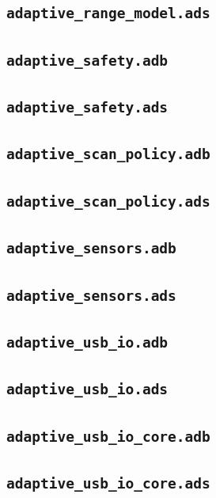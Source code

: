 \subsection*{\texttt{adaptive\_range\_model.ads}}

\subsection*{\texttt{adaptive\_safety.adb}}

\subsection*{\texttt{adaptive\_safety.ads}}

\subsection*{\texttt{adaptive\_scan\_policy.adb}}

\subsection*{\texttt{adaptive\_scan\_policy.ads}}

\subsection*{\texttt{adaptive\_sensors.adb}}

\subsection*{\texttt{adaptive\_sensors.ads}}

\subsection*{\texttt{adaptive\_usb\_io.adb}}

\subsection*{\texttt{adaptive\_usb\_io.ads}}

\subsection*{\texttt{adaptive\_usb\_io\_core.adb}}

\subsection*{\texttt{adaptive\_usb\_io\_core.ads}}

